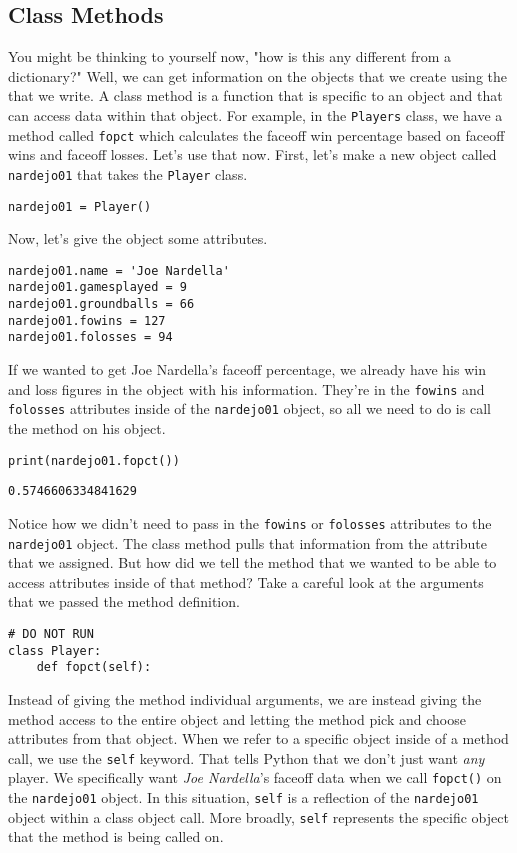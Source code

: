 \subsection{Class Methods}
You might be thinking to yourself now, "how is this any different from a dictionary?" Well, we can get information on the objects that we create using the  that we write. A class method is a function that is specific to an object and that can access data within that object. For example, in the \verb|Players| class, we have a method called \verb|fopct| which calculates the faceoff win percentage based on faceoff wins and faceoff losses. Let's use that now. First, let's make a new object called \verb|nardejo01| that takes the \verb|Player| class.\par
\begin{lstlisting}[style=pippython]
nardejo01 = Player()
\end{lstlisting}
Now, let's give the object some attributes.\par
\begin{lstlisting}[style=pippython]
nardejo01.name = 'Joe Nardella'
nardejo01.gamesplayed = 9
nardejo01.groundballs = 66
nardejo01.fowins = 127
nardejo01.folosses = 94
\end{lstlisting}
If we wanted to get Joe Nardella's faceoff percentage, we already have his win and loss figures in the object with his information. They're in the \verb|fowins| and \verb|folosses| attributes inside of the \verb|nardejo01| object, so all we need to do is call the method on his object.
\begin{lstlisting}[style=pippython]
print(nardejo01.fopct())
\end{lstlisting}
\begin{lstlisting}[style=none]
0.5746606334841629
\end{lstlisting}
Notice how we didn't need to pass in the \verb|fowins| or \verb|folosses| attributes to the \verb|nardejo01| object. The class method pulls that information from the attribute that we assigned. But how did we tell the method that we wanted to be able to access attributes inside of that method? Take a careful look at the arguments that we passed the method definition.\par
\begin{lstlisting}[style=pippython]
# DO NOT RUN
class Player:
	def fopct(self):
\end{lstlisting}
Instead of giving the method individual arguments, we are instead giving the method access to the entire object and letting the method pick and choose attributes from that object. When we refer to a specific object inside of a method call, we use the \verb|self| keyword. That tells Python that we don't just want \textit{any} player. We specifically want \textit{Joe Nardella}'s faceoff data when we call \verb|fopct()| on the \verb|nardejo01| object. In this situation, \verb|self| is a reflection of the \verb|nardejo01| object within a class object call. More broadly, \verb|self| represents the specific object that the method is being called on.\par
